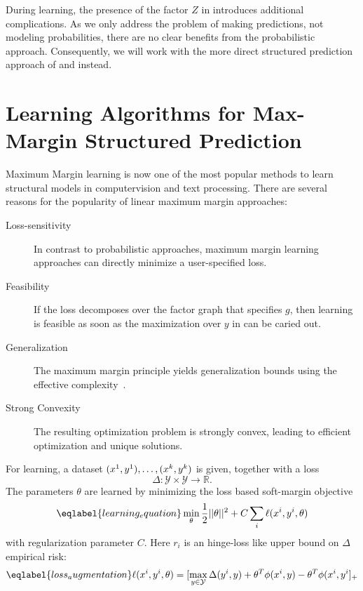During learning, the presence of the factor $Z$ in 
introduces additional complications. As we only address the problem of making
predictions, not modeling probabilities, there are no clear benefits from the
probabilistic approach.  Consequently, we will work with the more direct
structured prediction approach of  and
 instead.




\section{Learning Algorithms for Max-Margin Structured Prediction}

Maximum Margin learning is now one of the most popular methods to learn
structural models in computervision and text processing.
There are several reasons for the popularity of linear maximum margin approaches:
\begin{description}
    \item[Loss-sensitivity] In contrast to probabilistic approaches, maximum margin learning approaches can directly
        minimize a user-specified loss.
    \item[Feasibility] If the loss decomposes over the factor graph that
        specifies $g$, then learning is feasible as soon as the maximization
        over $y$ in  can be caried out.
    \item[Generalization] The maximum margin principle yields generalization
        bounds using the effective complexity~\citep{taskar2003max}.
    \item[Strong Convexity] The resulting optimization problem is strongly
        convex, leading to efficient optimization and unique solutions.
\end{description}

For learning, a dataset $(x^{1}, y^{1}),\dotsc,(x^{k}, y^{k})$ is given, together with a loss
\begin{equation}
    \Delta \colon \mathcal{Y} \times \mathcal{Y} \rightarrow \mathbb{R}.
\end{equation}
The parameters $\theta$ are learned by minimizing the loss based soft-margin
objective
\begin{equation}\eqlabel{learning_equation}
    \min_\theta \frac{1}{2} ||\theta||^2 + C \sum_i  \ell(x\hoch{i}, y\hoch{i}, \theta)
\end{equation}
with regularization parameter $C$. Here $r_i$ is an hinge-loss like upper bound
on $\Delta$ empirical risk:
\begin{equation}\eqlabel{loss_augmentation}
    \ell(x\hoch{i}, y\hoch{i}, \theta) = [\max_{y \in \mathcal{Y}} \Delta(y\hoch{i}, y) + \theta^T \phi(x\hoch{i}, y) - \theta^T \phi(x\hoch{i}, y\hoch{i}]_+
\end{equation}

